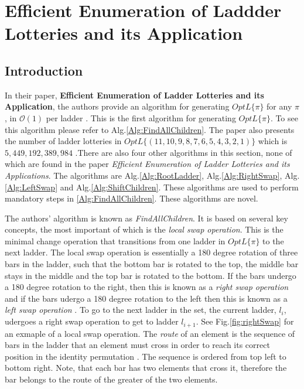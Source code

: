\section{Efficient Enumeration of Laddder Lotteries and its Application}

\subsection{Introduction}
In their paper, \textbf{Efficient Enumeration of Ladder Lotteries and its Application},
the authors provide an algorithm for generating $OptL\{\pi\}$ 
for any $\pi$, in $\mathcal{O}(1)$ per ladder \cite{A1}. This is the first algorithm for generating $OptL\{\pi\}$. 
To see this algorithm please refer to 
Alg.\ref{Alg:FindAllChildren}. The paper also presents the number 
of ladder lotteries in $OptL\{(11, 10, 9, 8, 7, 6, 5, 4, 3, 2, 1)\}$ which is 
$5,449,192,389,984$ \cite{A1}.There are also four other algorithms in 
this section, none of which are found in the paper \emph{Efficient Enumeration of Ladder Lotteries and its Applications}. The 
algorithms are Alg.\ref{Alg:RootLadder}, Alg.\ref{Alg:RightSwap}, Alg.\ref{Alg:LeftSwap} and Alg.\ref{Alg:ShiftChildren}.
These algorithms are used to perform mandatory steps in \ref{Alg:FindAllChildren}. These algorithms are novel.\par 
The authors' algorithm is known as \emph{FindAllChildren}. It is based on several key concepts, the most 
important of which is the \emph{local swap operation}. This is the 
minimal change operation that transitions from one ladder in $OptL\{\pi\}$ to the 
next ladder. The local swap operation is essentially a 180 degree rotation
of three bars in the ladder, such that the bottom
bar is rotated to the top, the middle bar stays in the middle and the top bar
is rotated to the bottom. If the bars undergo a 180 degree rotation to the right, 
then this is known as a \emph{right swap operation} and 
if the bars udergo a 180 degree rotation to the left then this 
is known as a \emph{left swap operation} \cite{A1}. To go to the next ladder in the set, 
the current ladder, $l_{i}$, udergoes a right swap operation 
to get to ladder $l_{i+1}$. See Fig.\ref{fig:rightSwap} for an exmaple of a 
local swap operation. The \emph{route} of an element is the sequence of bars in the ladder that an element must cross 
in order to reach its correct position in 
the identity permutation \cite{A1}. The sequence is ordered from top left to bottom right.
Note, that each bar has two elements that cross it, 
therefore the bar belongs to the route of the greater of the two elements. 
